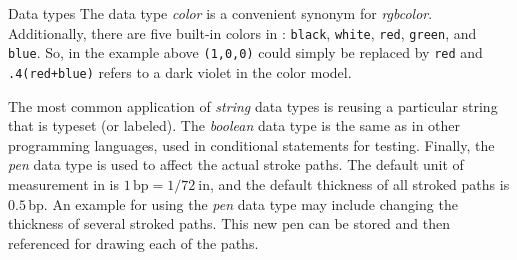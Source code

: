 \begin{section}{Data types}
The data type \textit{color} is a convenient synonym for
\textit{rgbcolor}.  Additionally, there are five built-in \RGB{} colors
in \MP{}: \texttt{black}, \texttt{white}, \texttt{red}, \texttt{green},
and \texttt{blue}.  So, in the example above \texttt{(1,0,0)} could
simply be replaced by \texttt{red} and \texttt{.4(red+blue)} refers to a
dark violet in the \RGB{} color model.

The most common application of \textit{string} data types is reusing a
particular string that is typeset (or labeled).  The \textit{boolean}
data type is the same as in other programming languages, used in
conditional statements for testing.  Finally, the \textit{pen} data type
is used to affect the actual stroke paths.  The default unit of
measurement in \MP{} is $1\,\mathrm{bp}=1/72\mathrm{\ in}$, and the
default thickness of all stroked paths is $0.5\,\mathrm{bp}$.  An
example for using the \textit{pen} data type may include changing the
thickness of several stroked paths.  This new pen can be stored and then
referenced for drawing each of the paths.
\end{section}
